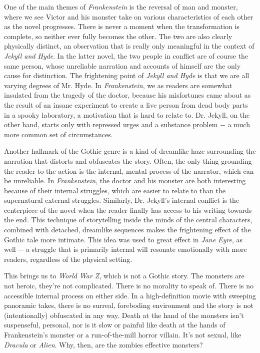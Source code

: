 \documentclass{article}
\begin{document}
\begin{doublespace}
One of the main themes of \textit{Frankenstein} is the reversal of man and monster, where we see Victor and his monster take on various characteristics of each other as the novel progresses. There is never a moment when the transformation is complete, so neither ever fully becomes the other. The two are also clearly physically distinct, an observation that is really only meaningful in the context of \textit{Jekyll and Hyde}. In the latter novel, the two people in conflict are of course the same person, whose unreliable narration and accounts of himself are the only cause for distinction. The frightening point of \textit{Jekyll and Hyde} is that we are all varying degrees of Mr. Hyde. In \textit{Frankenstein}, we as readers are somewhat insulated from the tragedy of the doctor, because his misfortunes came about as the result of an insane experiment to create a live person from dead body parts in a spooky laboratory, a motivation that is hard to relate to. Dr. Jekyll, on the other hand, starts only with repressed urges and a substance problem $-$ a much more common set of circumstances.

Another hallmark of the Gothic genre is a kind of dreamlike haze surrounding the narration that distorts and obfuscates the story. Often, the only thing grounding the reader to the action is the internal, mental process of the narrator, which can be unreliable. In \textit{Frankenstein}, the doctor and his monster are both interesting because of their internal struggles, which are easier to relate to than the supernatural external struggles. Similarly, Dr. Jekyll's internal conflict is the centerpiece of the novel when the reader finally has access to his writing towards the end. This technique of storytelling inside the minds of the central characters, combined with detached, dreamlike sequences makes the frightening effect of the Gothic tale more intimate. This idea was used to great effect in \textit{Jane Eyre}, as well $-$ a struggle that is primarily internal will resonate emotionally with more readers, regardless of the physical setting.
 
This brings us to \textit{World War Z}, which is not a Gothic story. The monsters are not heroic, they're not complicated. There is no morality to speak of. There is no accessible internal process on either side. In a high-definition movie with sweeping panoramic takes, there is no surreal, foreboding environment and the story is not (intentionally) obfuscated in any way. Death at the hand of the monsters isn't suspenseful, personal, nor is it slow or painful like death at the hands of Frankenstein's monster or a run-of-the-mill horror villain. It's not sexual, like \textit{Dracula} or \textit{Alien}. Why, then, are the zombies effective monsters?


\end{doublespace}
\end{document}
